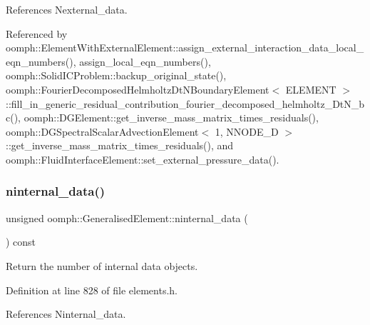 References Nexternal\+\_\+data.



Referenced by oomph\+::\+Element\+With\+External\+Element\+::assign\+\_\+external\+\_\+interaction\+\_\+data\+\_\+local\+\_\+eqn\+\_\+numbers(), assign\+\_\+local\+\_\+eqn\+\_\+numbers(), oomph\+::\+Solid\+I\+C\+Problem\+::backup\+\_\+original\+\_\+state(), oomph\+::\+Fourier\+Decomposed\+Helmholtz\+Dt\+N\+Boundary\+Element$<$ E\+L\+E\+M\+E\+N\+T $>$\+::fill\+\_\+in\+\_\+generic\+\_\+residual\+\_\+contribution\+\_\+fourier\+\_\+decomposed\+\_\+helmholtz\+\_\+\+Dt\+N\+\_\+bc(), oomph\+::\+D\+G\+Element\+::get\+\_\+inverse\+\_\+mass\+\_\+matrix\+\_\+times\+\_\+residuals(), oomph\+::\+D\+G\+Spectral\+Scalar\+Advection\+Element$<$ 1, N\+N\+O\+D\+E\+\_\+D $>$\+::get\+\_\+inverse\+\_\+mass\+\_\+matrix\+\_\+times\+\_\+residuals(), and oomph\+::\+Fluid\+Interface\+Element\+::set\+\_\+external\+\_\+pressure\+\_\+data().

\mbox{\label{classoomph_1_1GeneralisedElement_a6b736de0af4c92831968636479b3480e}} 
\subsubsection{\texorpdfstring{ninternal\+\_\+data()}{ninternal\_data()}}
{\footnotesize\ttfamily unsigned oomph\+::\+Generalised\+Element\+::ninternal\+\_\+data (\begin{DoxyParamCaption}{ }\end{DoxyParamCaption}) const\hspace{0.3cm}{\ttfamily [inline]}}



Return the number of internal data objects. 



Definition at line 828 of file elements.\+h.



References Ninternal\+\_\+data.



